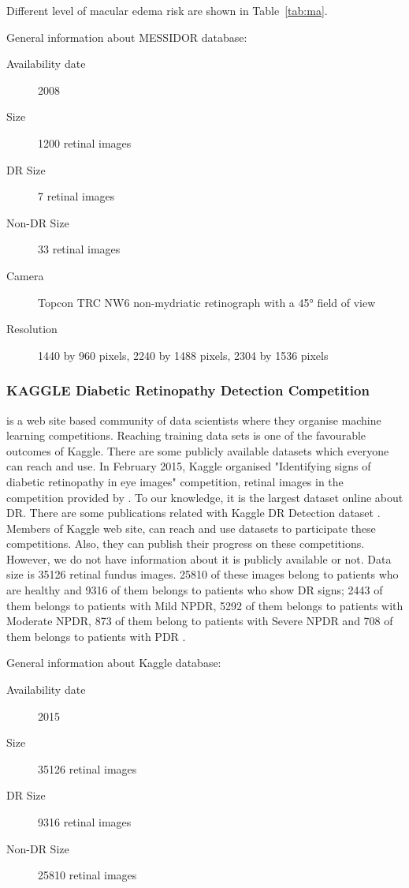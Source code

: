 Different level of macular edema risk are shown in Table~\ref{tab:ma}.


General information about MESSIDOR database:

\begin{description}
    \item[Availability date] 2008
    \item[Size] 1200 retinal images
    \item[DR Size] 7 retinal images
    \item[Non-DR Size] 33 retinal images
    \item[Camera]  Topcon TRC NW6 non-mydriatic retinograph with a 45° field of view
    \item[Resolution] 1440 by 960 pixels, 2240 by 1488 pixels, 2304 by 1536 pixels
\end{description}


\subsubsection{KAGGLE Diabetic Retinopathy Detection Competition}
\citet{KAGGLE} is a web site based community of data scientists where they organise machine learning competitions. Reaching training data sets is one of the favourable outcomes of Kaggle. There are some publicly available datasets which everyone can reach and use. In February 2015, Kaggle organised "Identifying signs of diabetic retinopathy in eye images" competition, retinal images in the competition provided by \citet{eyePACS}. To our knowledge, it is the largest dataset online about DR. There are some publications related with Kaggle DR Detection dataset \citep{albanautomated, van2016fast}. Members of Kaggle web site, can reach and use datasets to participate these competitions. Also, they can publish their progress on these competitions. However, we do not have information about it is publicly available or not. Data size is 35126 retinal fundus images\citep{van2016fast}. 25810 of these images belong to patients who are healthy and 9316 of them belongs to patients who show DR signs; 2443 of them belongs to patients with Mild NPDR, 5292 of them belongs to patients with Moderate NPDR, 873 of them belong to patients with Severe NPDR and 708 of them belongs to patients with PDR \citep{albanautomated}. 


General information about Kaggle database:
\begin{description}
    \item[Availability date] 2015
    \item[Size] 35126 retinal images
    \item[DR Size] 9316 retinal images
    \item[Non-DR Size] 25810 retinal images
\end{description}

